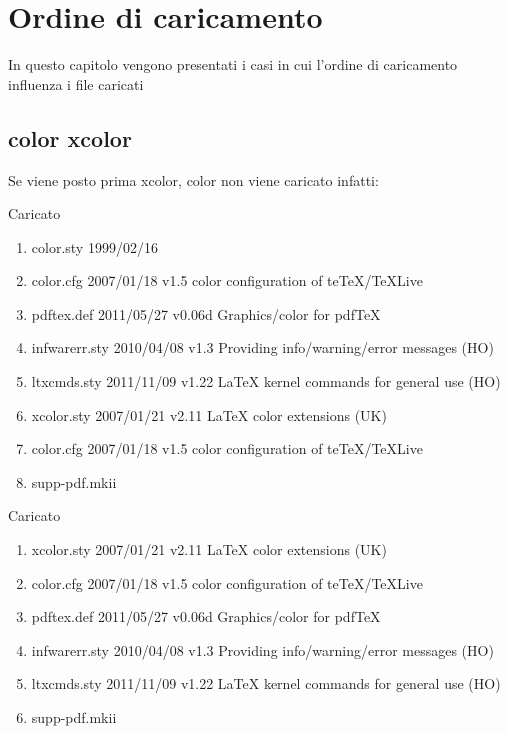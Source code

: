 \chapter{Ordine di caricamento}
In questo capitolo vengono presentati i casi in cui l'ordine di caricamento influenza i file caricati
\section{color xcolor}
Se viene posto prima xcolor, color non viene caricato infatti: 

Caricato 
\begin{enumerate}
\item color.sty 1999/02/16
\item color.cfg 2007/01/18 v1.5 color configuration of teTeX/TeXLive
\item pdftex.def 2011/05/27 v0.06d Graphics/color for pdfTeX
\item infwarerr.sty 2010/04/08 v1.3 Providing info/warning/error messages (HO)
\item ltxcmds.sty 2011/11/09 v1.22 LaTeX kernel commands for general use (HO)
\item xcolor.sty 2007/01/21 v2.11 LaTeX color extensions (UK)
\item color.cfg 2007/01/18 v1.5 color configuration of teTeX/TeXLive
\item supp-pdf.mkii
\end{enumerate}

Caricato 
\begin{enumerate}
\item xcolor.sty 2007/01/21 v2.11 LaTeX color extensions (UK)
\item color.cfg 2007/01/18 v1.5 color configuration of teTeX/TeXLive
\item pdftex.def 2011/05/27 v0.06d Graphics/color for pdfTeX
\item infwarerr.sty 2010/04/08 v1.3 Providing info/warning/error messages (HO)
\item ltxcmds.sty 2011/11/09 v1.22 LaTeX kernel commands for general use (HO)
\item supp-pdf.mkii
\end{enumerate}
